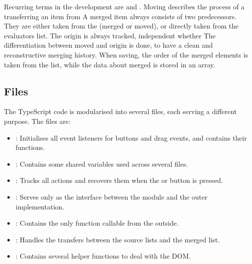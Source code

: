 Recurring terms in the development are  and .
Moving describes the process of a transferring an item from A merged
item always consists of two predecessors. They are either taken from the
 (merged or moved), or directly taken from the
evaluators list. The origin is always tracked, independent whether The
differentiation between moved and origin is done, to have a clean and
reconstructive merging history. When saving, the order of the merged
elements is taken from the list, while the data about merged is stored
in an array. 


\subsection{Files}

The TypeScript code is modularised into several files, each serving a
different purpose. The files are:
\begin{itemize}
\item {}: Initialises all event listeners for buttons
and drag events, and contains their functions.
\item {}: Contains some shared variables used across several files.
\item {}: Tracks all actions and recovers them when the  or  button is pressed.
\item {}: Serves only as the interface between the module and the outer implementation.
\item {}: Contains the only function callable from the outside.
\item {}: Handles the transfers between the source lists and the merged list.
\item {}: Contains several helper functions to deal with the DOM.
\end{itemize}
